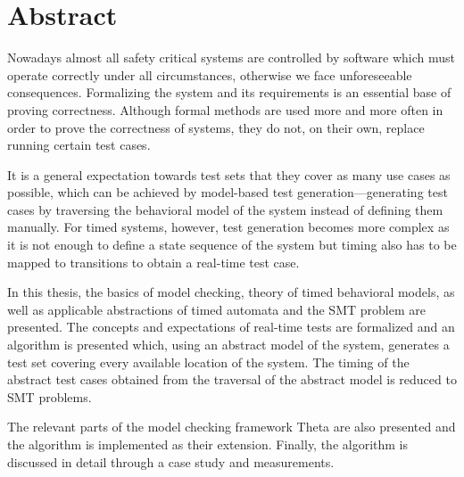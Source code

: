 \chapter*{Abstract}

Nowadays almost all safety critical systems are controlled by software which must operate correctly under all circumstances, otherwise we face unforeseeable consequences. Formalizing the system and its requirements is an essential base of proving correctness. Although formal methods are used more and more often in order to prove the correctness of systems, they do not, on their own, replace running certain test cases.

It is a general expectation towards test sets that they cover as many use cases as possible, which can be achieved by model-based test generation—generating test cases by traversing the behavioral model of the system instead of defining them manually. For timed systems, however, test generation becomes more complex as it is not enough to define a state sequence of the system but timing also has to be mapped to transitions to obtain a real-time test case.

In this thesis, the basics of model checking, theory of timed behavioral models, as well as applicable abstractions of timed automata and the SMT problem are presented. The concepts and expectations of real-time tests are formalized and an algorithm is presented which, using an abstract model of the system, generates a test set covering every available location of the system. The timing of the abstract test cases obtained from the traversal of the abstract model is reduced to SMT problems.

The relevant parts of the model checking framework Theta are also presented and the algorithm is implemented as their extension. Finally, the algorithm is discussed in detail through a case study and measurements.

\vfill
\cleardoublepage

\selectthesislanguage

\setcounter{romanPage}{\value{page}}
